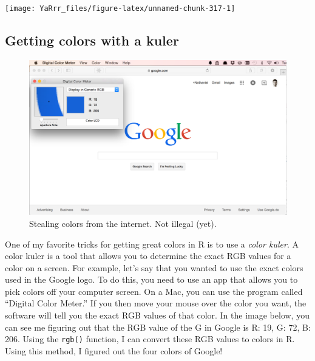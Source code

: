 \documentclass[]{book}
\theoremstyle{definition}
\theoremstyle{definition}
\theoremstyle{remark}
\begin{document}
\begin{center}\texttt{[image: YaRrr\_files/figure-latex/unnamed-chunk-317-1]} \end{center}

\subsection{Getting colors with a
kuler}\label{getting-colors-with-a-kuler}

\begin{figure}

{\centering \includegraphics[width=1\linewidth]{images/kuler} 

}

\caption{Stealing colors from the internet. Not illegal (yet).}\label{fig:kuler}
\end{figure}

One of my favorite tricks for getting great colors in R is to use a
\emph{color kuler}. A color kuler is a tool that allows you to determine
the exact RGB values for a color on a screen. For example, let's say
that you wanted to use the exact colors used in the Google logo. To do
this, you need to use an app that allows you to pick colors off your
computer screen. On a Mac, you can use the program called ``Digital
Color Meter.'' If you then move your mouse over the color you want, the
software will tell you the exact RGB values of that color. In the image
below, you can see me figuring out that the RGB value of the G in Google
is R: 19, G: 72, B: 206. Using the \texttt{rgb()} function, I can
convert these RGB values to colors in R. Using this method, I figured
out the four colors of Google!
\end{document}
